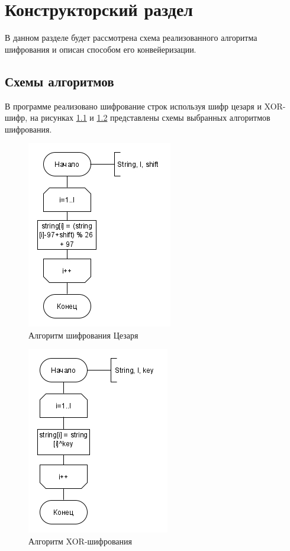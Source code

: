 \chapter{Конструкторский раздел}
\label{cha:design}
В данном разделе будет рассмотрена схема реализованного алгоритма шифрования и описан способом его конвейеризации.

\section{Схемы алгоритмов}
\label{sec:schemes}
В программе реализовано шифрование строк используя шифр цезаря и XOR-шифр, на рисунках \ref{fig:caesar} и \ref{fig:xor} представлены схемы выбранных алгоритмов шифрования.
\begin{figure}[H]
	\centering
	\includegraphics[width=0.5\linewidth]{src/caesar}
	\caption{Алгоритм шифрования Цезаря}
	\label{fig:caesar}
\end{figure}
\begin{figure}[H]
	\centering
	\includegraphics[width=0.5\linewidth]{src/xor}
	\caption{Алгоритм XOR-шифрования}
	\label{fig:xor}
\end{figure}

